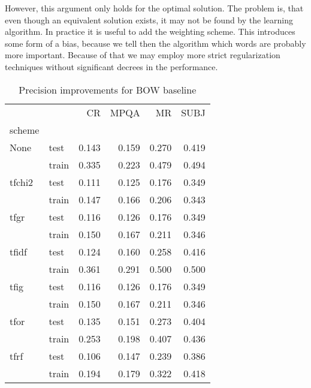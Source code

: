     However, this argument only holds for the optimal solution. 
    The problem is, that even though an equivalent solution exists, it may not be found by the learning algorithm. 
    In practice it is useful to add the weighting scheme. 
    This introduces some form of a bias, because we tell then the algorithm which words are probably more important.
    Because of that we may employ more strict regularization techniques without significant decrees in the performance.
    

\begin{table}[H]
\begin{center}

\begin{tabular}{llrrrr}
\toprule
{} &      &  CR &  MPQA &  MR &  SUBJ \\
scheme &  &            &              &            &              \\
\midrule
None & test &      0.143 &        0.159 &      0.270 &        0.419 \\
{} & train &      0.335 &        0.223 &      0.479 &        0.494 \\
tfchi2 & test &      0.111 &        0.125 &      0.176 &        0.349 \\
{} & train &      0.147 &        0.166 &      0.206 &        0.343 \\
tfgr & test &      0.116 &        0.126 &      0.176 &        0.349 \\
{} & train &      0.150 &        0.167 &      0.211 &        0.346 \\
tfidf & test &      0.124 &        0.160 &      0.258 &        0.416 \\
{} & train &      0.361 &        0.291 &      0.500 &        0.500 \\
tfig & test &      0.116 &        0.126 &      0.176 &        0.349 \\
{} & train &      0.150 &        0.167 &      0.211 &        0.346 \\
tfor & test &      0.135 &        0.151 &      0.273 &        0.404 \\
{} & train &      0.253 &        0.198 &      0.407 &        0.436 \\
tfrf & test &      0.106 &        0.147 &      0.239 &        0.386 \\
{} & train &      0.194 &        0.179 &      0.322 &        0.418 \\
\bottomrule
\end{tabular}

\caption[Precision improvements for BOW baseline]{Precision improvements for BOW baseline}
\label{tab:}
\end{center}
\end{table}

